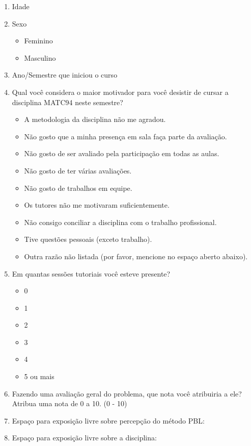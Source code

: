 \acresetall
\label{form-disciplina-desistente}
\begin{enumerate}
\item{Idade}
\item{Sexo}
\begin{itemize}
	\item{Feminino}
	\item{Masculino}
\end{itemize}
\item{Ano/Semestre que iniciou o curso}
\AfirmacaoLikert{\LikertDA{}}
\AfirmacaoLikert{\LikertDB{}}
\AfirmacaoLikert{\LikertDC{}}
\AfirmacaoLikert{\LikertDD{}}
\AfirmacaoLikert{\LikertDE{}}
\AfirmacaoLikert{\LikertDF{}}
\AfirmacaoLikertA{\LikertDG{}}
\AfirmacaoLikert{\LikertDGa{}}
\item{Qual você considera o maior motivador para você desistir de
cursar a disciplina MATC94 neste semestre?}
\begin{itemize}
\item{A metodologia da disciplina não me agradou.}
\item{Não gosto que a minha presença em sala faça parte da avaliação.}
\item{Não gosto de ser avaliado pela participação em todas as aulas.}
\item{Não gosto de ter várias avaliações.}
\item{Não gosto de trabalhos em equipe.}
\item{Os tutores não me motivaram suficientemente.}
\item{Não consigo conciliar a disciplina com o trabalho profissional.}
\item{Tive questões pessoais (exceto trabalho).}
\item{Outra razão não listada (por favor, mencione no espaço aberto abaixo).}
\end{itemize}
\AfirmacaoLikert{\LikertDH{}}
\AfirmacaoLikert{\LikertDI{}}
\AfirmacaoLikert{\LikertDJ{}}
\AfirmacaoLikert{\LikertDO{}}
\item{Em quantas sessões tutoriais você esteve presente?}
\begin{itemize}
\item{0}
\item{1}
\item{2}
\item{3}
\item{4}
\item{5 ou mais}
\end{itemize}
\AfirmacaoLikert{\LikertDOa{}}
\item{Fazendo uma avaliação geral do problema, que nota você
atribuiria a ele? Atribua uma nota de 0 a 10. (0 - 10)}
\item{Espaço para exposição livre sobre percepção do método PBL:}
\item{Espaço para exposição livre sobre a disciplina:}
\end{enumerate}
